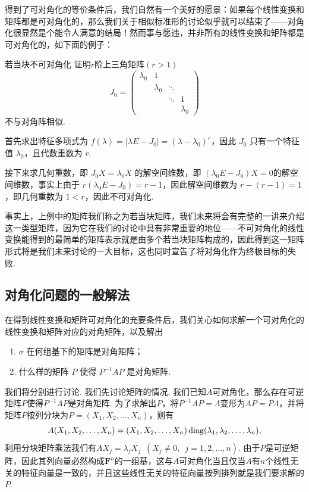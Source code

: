 得到了可对角化的等价条件后，我们自然有一个美好的愿景：如果每个线性变换和矩阵都是可对角化的，那么我们关于相似标准形的讨论似乎就可以结束了——对角化很显然是个能令人满意的结局！然而事与愿违，并非所有的线性变换和矩阵都是可对角化的，如下面的例子：
\begin{example}{}{若当块不可对角化}
    证明$r$阶上三角矩阵$(r>1)$
    \[J_0=\begin{pmatrix}
            \lambda_0 & 1         &        &           \\
                      & \lambda_0 & \ddots &           \\
                      &           & \ddots & 1         \\
                      &           &        & \lambda_0
        \end{pmatrix}\]
    不与对角阵相似.
\end{example}

\begin{solution}
    首先求出特征多项式为 $f(\lambda) = |\lambda E - J_0| = (\lambda - \lambda_0)^r$，因此 $J_0$ 只有一个特征值 $\lambda_0$，且代数重数为 $r$.

    接下来求几何重数，即 $J_0X = \lambda_0X$ 的解空间维数，即 $(\lambda_0 E - J_0)X = 0$的解空间维数，事实上由于 $r(\lambda_0 E - J_0) = r - 1$，因此解空间维数为 $r - (r - 1) = 1$，即几何重数为 $1 < r$，因此不可对角化.
\end{solution}

事实上，上例中的矩阵我们称之为若当块矩阵，我们未来将会有完整的一讲来介绍这一类型矩阵，因为它在我们的讨论中具有非常重要的地位——不可对角化的线性变换能得到的最简单的矩阵表示就是由多个若当块矩阵构成的，因此得到这一矩阵形式将是我们未来讨论的一大目标，这也同时宣告了将对角化作为终极目标的失败.

\subsection{对角化问题的一般解法}

在得到线性变换和矩阵可对角化的充要条件后，我们关心如何求解一个可对角化的线性变换和矩阵对应的对角矩阵，以及解出
\begin{enumerate}
    \item $\sigma$ 在何组基下的矩阵是对角矩阵；

    \item 什么样的矩阵 $P$ 使得 $P^{-1}AP$ 是对角矩阵.
\end{enumerate}

我们将分别进行讨论. 我们先讨论矩阵的情况. 我们已知$A$可对角化，那么存在可逆矩阵$P$使得$P^{-1}AP$是对角矩阵. 为了求解出$P$，将$P^{-1}AP=\varLambda$变形为$AP=P\varLambda$，并将矩阵$P$按列分块为$P=(X_1,X_2,\ldots,X_n)$，则有
\[A(X_1,X_2,\ldots,X_n)=(X_1,X_2,\ldots,X_n)\operatorname{diag}(\lambda_1,\lambda_2,\ldots,\lambda_n),\]
利用分块矩阵乘法我们有$AX_j=\lambda_jX_j\enspace(X_j\neq 0,\enspace j=1,2,\ldots,n)$. 由于$P$是可逆矩阵，因此其列向量必然构成$\mathbf{F}^n$的一组基，这与$A$可对角化当且仅当$A$有$n$个线性无关的特征向量是一致的，并且这些线性无关的特征向量按列排列就是我们要求解的$P$.

